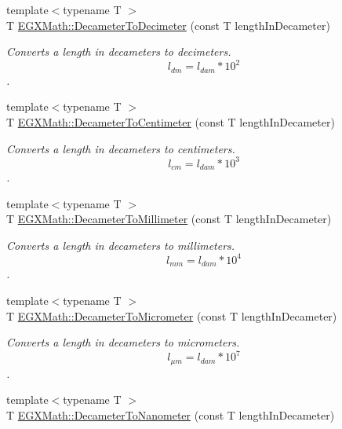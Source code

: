 \begin{DoxyCompactItemize}
{\footnotesize template$<$typename T $>$ }\\T \mbox{\hyperlink{group___e_g_x_math-_conversions-_length_conversions-_s_i-_decameter-_s_i_gac3c82c1b67121be9717c2619bc26242b}{E\+G\+X\+Math\+::\+Decameter\+To\+Decimeter}} (const T length\+In\+Decameter)
\begin{DoxyCompactList}\small\item\em Converts a length in decameters to decimeters. \[ l_{dm}=l_{dam} * 10^{2} \]. \end{DoxyCompactList}\item 
{\footnotesize template$<$typename T $>$ }\\T \mbox{\hyperlink{group___e_g_x_math-_conversions-_length_conversions-_s_i-_decameter-_s_i_gab715f0e130e7886966146153786abc5d}{E\+G\+X\+Math\+::\+Decameter\+To\+Centimeter}} (const T length\+In\+Decameter)
\begin{DoxyCompactList}\small\item\em Converts a length in decameters to centimeters. \[ l_{cm}=l_{dam} * 10^{3} \]. \end{DoxyCompactList}\item 
{\footnotesize template$<$typename T $>$ }\\T \mbox{\hyperlink{group___e_g_x_math-_conversions-_length_conversions-_s_i-_decameter-_s_i_gaa1ebc69084f0d429e62a6af0ef509bb7}{E\+G\+X\+Math\+::\+Decameter\+To\+Millimeter}} (const T length\+In\+Decameter)
\begin{DoxyCompactList}\small\item\em Converts a length in decameters to millimeters. \[ l_{mm}=l_{dam} * 10^{4} \]. \end{DoxyCompactList}\item 
{\footnotesize template$<$typename T $>$ }\\T \mbox{\hyperlink{group___e_g_x_math-_conversions-_length_conversions-_s_i-_decameter-_s_i_gaa5b6d3a32a921345aa1ccb66a8df07c1}{E\+G\+X\+Math\+::\+Decameter\+To\+Micrometer}} (const T length\+In\+Decameter)
\begin{DoxyCompactList}\small\item\em Converts a length in decameters to micrometers. \[ l_{\mu m}=l_{dam} * 10^{7} \]. \end{DoxyCompactList}\item 
{\footnotesize template$<$typename T $>$ }\\T \mbox{\hyperlink{group___e_g_x_math-_conversions-_length_conversions-_s_i-_decameter-_s_i_gad2173f361037d8cfbdcc6b99c79a9105}{E\+G\+X\+Math\+::\+Decameter\+To\+Nanometer}} (const T length\+In\+Decameter)

\end{DoxyCompactItemize}
